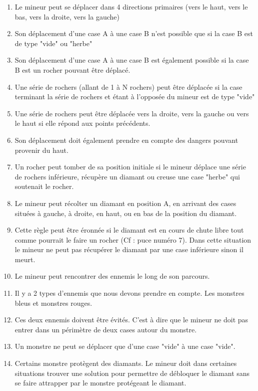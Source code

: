 \documentclass[a4paper,11pt]{article}
\begin{document}
		\begin{enumerate}
			\item Le mineur peut se d\'eplacer dans 4 directions primaires (vers le haut, vers le bas, vers la droite, vers la gauche)
			\item Son d\'eplacement d'une case A \`a une case B n'est possible que si la case B est de type "vide" ou "herbe"
			\item Son d\'eplacement d'une case A \`a une case B est \'egalement possible si la case B est un rocher pouvant \^etre d\'eplac\'e.
			\item Une s\'erie de rochers (allant de 1 \`a N rochers) peut \^etre d\'eplac\'ee si la case terminant la s\'erie de rochers et \'etant \`a l'oppos\'ee du mineur est de type "vide"
			\item Une s\'erie de rochers peut \^etre d\'eplac\'ee vers la droite, vers la gauche ou vers le haut si elle r\'epond aux points pr\'ec\'edents.
			\item Son d\'eplacement doit \'egalement prendre en compte des dangers pouvant provenir du haut.
			\item Un rocher peut tomber de sa position initiale si le mineur d\'eplace une s\'erie de rochers inf\'erieure, r\'ecup\`ere un diamant ou creuse une case "herbe" qui soutenait le rocher.
			\item Le mineur peut r\'ecolter un diamant en position A, en arrivant des cases situ\'ees \`a gauche, \`a droite, en haut, ou en bas de la position du diamant.
			\item Cette r\`egle peut \^etre \'eronn\'ee si le diamant est en cours de chute libre tout comme pourrait le faire un rocher (Cf : puce num\'ero 7). Dans cette situation le mineur ne peut pas r\'ecup\'erer le diamant par une case inf\'erieure sinon il meurt.
			\item Le mineur peut rencontrer des ennemis le long de son parcours.
			\item Il y a 2 types d'ennemis que nous devons prendre en compte. Les monstres bleus et monstres rouges.
			\item Ces deux ennemis doivent \^etre \'evit\'es. C'est \`a dire que le mineur ne doit pas entrer dans un p\'erim\`etre de deux cases autour du monstre.
			\item Un monstre ne peut se d\'eplacer que d'une case "vide" \`a une case "vide".
			\item Certains monstre prot\`egent des diamants. Le mineur doit dans certaines situations trouver une solution pour permettre de d\'ebloquer le diamant sans se faire attrapper par le monstre prot\'egeant le diamant.

\end{enumerate}
\end{document}

